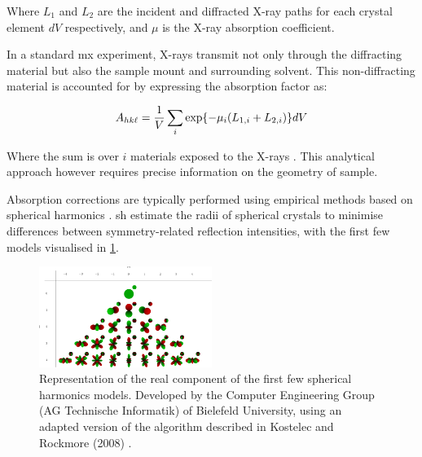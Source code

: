 Where $L_1$ and $L_2$ are the incident and diffracted X-ray paths for each crystal element $dV$ respectively, and $\mu$ is the X-ray absorption coefficient. \cite{Busing1957}

In a standard \ac{mx} experiment, X-rays transmit not only through the diffracting material but also the sample mount and surrounding solvent. This non-diffracting material is accounted for by expressing the absorption factor as:

\begin{equation}
    A_{hk\ell} = \frac{1}{V} \sum_i \exp{-\mu_i (L_{1,i}+L_{2,i})} dV
    \label{AbsFactor_allmaterials}
\end{equation}

Where the sum is over $i$ materials exposed to the X-rays \cite{Santoro1968}. This analytical approach however requires precise information on the geometry of sample.

Absorption corrections are typically performed using empirical methods based on spherical harmonics \cite{Blessing1995}. \ac{sh} estimate the radii of spherical crystals to minimise differences between symmetry-related reflection intensities, with the first few models visualised in \cref{fig:SH}. %


\begin{figure}
    \centering
    \includegraphics[trim={2.3cm 0 0 2.4cm},clip,width = 0.5\textwidth]{images/sh_basis.png}
    \caption{Representation of the real component of the first few spherical harmonics models. Developed by the Computer Engineering Group (AG Technische Informatik)
of Bielefeld University, using an adapted version of the algorithm described in Kostelec and Rockmore (2008) \cite{Kostelec2008}.}
    \label{fig:SH}
\end{figure}



